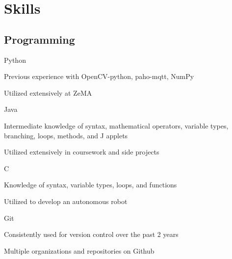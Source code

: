 \documentclass[]{resume-openfont}
\begin{document}
\begin{minipage}[t]{0.33\textwidth}
\section{Skills}
\subsection{Programming}
Python
\begin{tightemize}
\vspace{\topsep}
\item Previous experience with OpenCV-python, paho-mqtt, NumPy 
\item Utilized extensively at ZeMA\end{tightemize}
\vspace{\topsep}
Java 
\begin{tightemize}
\vspace{\topsep}
\item Intermediate knowledge of syntax, mathematical operators, variable types, branching, loops, methods, and J applets 
\item Utilized extensively in coursework and side projects\end{tightemize}
\vspace{\topsep}
C
\begin{tightemize}
\vspace{\topsep}
\item Knowledge of syntax, variable types, loops, and functions 
\item Utilized to develop an autonomous robot\end{tightemize}
\vspace{\topsep}
Git
\begin{tightemize}
\vspace{\topsep}
\item Consistently used for version control over the past 2 years \item Multiple organizations and repositories on Github\end{tightemize}


%
%

\end{minipage} 
\hfill
\end{document}
